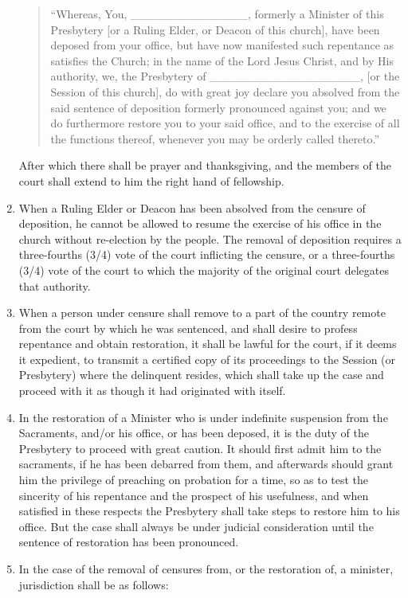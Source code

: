 \documentclass[
]{book}
\begin{document}
\begin{enumerate}
  \begin{quote}
  ``Whereas, You, \_\_\_\_\_\_\_\_\_\_\_\_\_\_, formerly a Minister of this Presbytery {[}or a Ruling Elder, or Deacon of this church{]}, have been deposed from your office, but have now manifested such repentance as satisfies the Church; in the name of the Lord Jesus Christ, and by His authority, we, the Presbytery of \_\_\_\_\_\_\_\_\_\_\_\_\_\_\_\_\_\_, {[}or the Session of this church{]}, do with great joy declare you absolved from the said sentence of deposition formerly pronounced against you; and we do furthermore restore you to your said office, and to the exercise of all the functions thereof, whenever you may be orderly called thereto.''
  \end{quote}

  After which there shall be prayer and thanksgiving, and the members of the court shall extend to him the right hand of fellowship.
\item
  When a Ruling Elder or Deacon has been absolved from the censure of deposition, he cannot be allowed to resume the exercise of his office in the church without re-election by the people. The removal of deposition requires a three-fourths (3/4) vote of the court inflicting the censure, or a three-fourths (3/4) vote of the court to which the majority of the original court delegates that authority.
\item
  When a person under censure shall remove to a part of the country remote from the court by which he was sentenced, and shall desire to profess repentance and obtain restoration, it shall be lawful for the court, if it deems it expedient, to transmit a certified copy of its proceedings to the Session (or Presbytery) where the delinquent resides, which shall take up the case and proceed with it as though it had originated with itself.
\item
  In the restoration of a Minister who is under indefinite suspension from the Sacraments, and/or his office, or has been deposed, it is the duty of the Presbytery to proceed with great caution. It should first admit him to the sacraments, if he has been debarred from them, and afterwards should grant him the privilege of preaching on probation for a time, so as to test the sincerity of his repentance and the prospect of his usefulness, and when satisfied in these respects the Presbytery shall take steps to restore him to his office. But the case shall always be under judicial consideration until the sentence of restoration has been pronounced.
\item
  In the case of the removal of censures from, or the restoration of, a minister, jurisdiction shall be as follows:


\end{enumerate}
\end{document}
